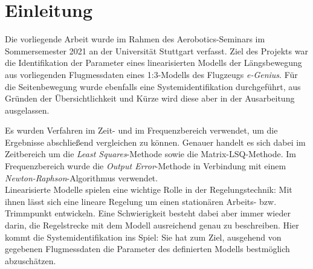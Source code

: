 \chapter{Einleitung}
Die vorliegende Arbeit wurde im Rahmen des Aerobotics-Seminars im Sommersemester 2021 an der Universität Stuttgart verfasst. 
Ziel des Projekts war die Identifikation der Parameter eines linearisierten Modells der Längsbewegung aus vorliegenden 
Flugmessdaten eines 1:3-Modells des Flugzeugs \textit{e-Genius}. Für die Seitenbewegung wurde ebenfalls eine 
Systemidentifikation durchgeführt, aus Gründen der Übersichtlichkeit und Kürze wird diese aber in der Ausarbeitung 
ausgelassen.\par
Es wurden Verfahren im Zeit- und im Frequenzbereich verwendet, um die Ergebnisse abschließend vergleichen zu können. Genauer 
handelt es sich dabei im Zeitbereich um die \textit{Least Squares}-Methode sowie die Matrix-LSQ-Methode. Im Frequenzbereich 
wurde die \textit{Output Error}-Methode in Verbindung mit einem \textit{Newton-Raphson}-Algorithmus verwendet.\\

Linearisierte Modelle spielen eine wichtige Rolle in der Regelungstechnik: Mit ihnen lässt sich eine lineare Regelung um 
einen stationären Arbeits- bzw. Trimmpunkt entwickeln. Eine Schwierigkeit besteht dabei aber immer wieder darin, die 
Regelstrecke mit dem Modell ausreichend genau zu beschreiben. Hier kommt die Systemidentifikation ins Spiel: Sie hat zum 
Ziel, ausgehend von gegebenen Flugmessdaten die Parameter des definierten Modells bestmöglich abzuschätzen.